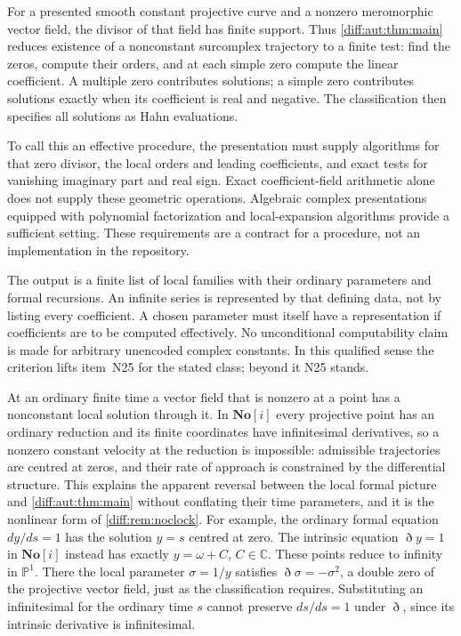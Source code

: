 \documentclass[11pt,letterpaper]{article}
\numberwithin{equation}{section}
\theoremstyle{definition}
\theoremstyle{remark}
\newcommand{\SC}{\mathbf{No}[i]}
\newcommand{\C}{\mathbb C}
\newcommand{\Dn}{\eth}
\begin{document}
\begin{remark}
\label{diff:aut:rem:decision}
For a presented smooth constant projective curve and a nonzero
meromorphic vector field, the divisor of that field has finite support.
Thus \cref{diff:aut:thm:main} reduces existence of a nonconstant
surcomplex trajectory to a finite test: find the zeros, compute their
orders, and at each simple zero compute the linear coefficient.
A multiple zero contributes solutions; a simple zero contributes
solutions exactly when its coefficient is real and negative.
The classification then specifies all solutions as Hahn evaluations.

To call this an effective procedure, the presentation must supply
algorithms for that zero divisor, the local orders and leading
coefficients, and exact tests for vanishing imaginary part and real
sign. Exact coefficient-field arithmetic alone does not supply
these geometric operations. Algebraic complex presentations equipped
with polynomial factorization and local-expansion algorithms provide
a sufficient setting. These requirements are a contract for a
procedure, not an implementation in the repository.

The output is a finite list of local families with their ordinary
parameters and formal recursions. An infinite series is represented
by that defining data, not by listing every coefficient. A chosen
parameter must itself have a representation if coefficients are to
be computed effectively. No unconditional computability claim is
made for arbitrary unencoded complex constants. In this qualified
sense the criterion lifts item~N25 for the stated class; beyond it
N25 stands.
\end{remark}

\begin{remark}
\label{diff:aut:rem:formalivp}
At an ordinary finite time a vector field that is nonzero at a point has a
nonconstant local solution through it. In $\SC$ every projective point has an
ordinary reduction and its finite coordinates have infinitesimal derivatives, so
a nonzero constant velocity at the reduction is impossible: admissible
trajectories are centred at zeros, and their rate of approach is constrained by
the differential structure. This explains the apparent reversal between the local
formal picture and \cref{diff:aut:thm:main} without conflating their time
parameters, and it is the nonlinear form of \cref{diff:rem:noclock}.
For example, the ordinary formal equation $dy/ds=1$ has the
solution $y=s$ centred at zero. The intrinsic equation $\Dn y=1$
in $\SC$ instead has exactly $y=\omega+C$, $C\in\C$.
These points reduce to infinity in $\mathbb P^1$. There the local
parameter $\sigma=1/y$ satisfies $\Dn\sigma=-\sigma^2$,
a double zero of the projective vector field, just as the
classification requires. Substituting an infinitesimal for the
ordinary time $s$ cannot preserve $ds/ds=1$ under $\Dn$, since
its intrinsic derivative is infinitesimal.
\end{remark}
\end{document}
